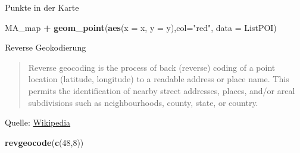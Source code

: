 \documentclass[ignorenonframetext,]{beamer}
\newenvironment{Shaded}{\begin{snugshade}}{\end{snugshade}}
\newcommand{\DataTypeTok}[1]{\textcolor[rgb]{0.13,0.29,0.53}{#1}}
\newcommand{\DecValTok}[1]{\textcolor[rgb]{0.00,0.00,0.81}{#1}}
\newcommand{\KeywordTok}[1]{\textcolor[rgb]{0.13,0.29,0.53}{\textbf{#1}}}
\newcommand{\NormalTok}[1]{#1}
\newcommand{\OperatorTok}[1]{\textcolor[rgb]{0.81,0.36,0.00}{\textbf{#1}}}
\newcommand{\StringTok}[1]{\textcolor[rgb]{0.31,0.60,0.02}{#1}}
\begin{document}
\begin{frame}[fragile]{Punkte in der Karte}
\protect\hypertarget{punkte-in-der-karte-1}{}

\begin{Shaded}
\begin{Highlighting}[]
\NormalTok{MA_map }\OperatorTok{+}
\KeywordTok{geom_point}\NormalTok{(}\KeywordTok{aes}\NormalTok{(}\DataTypeTok{x =}\NormalTok{ x, }\DataTypeTok{y =}\NormalTok{ y),}\DataTypeTok{col=}\StringTok{"red"}\NormalTok{,}
\DataTypeTok{data =}\NormalTok{ ListPOI)}
\end{Highlighting}
\end{Shaded}

\end{frame}

\begin{frame}[fragile]{Reverse Geokodierung}
\protect\hypertarget{reverse-geokodierung}{}

\begin{quote}
Reverse geocoding is the process of back (reverse) coding of a point
location (latitude, longitude) to a readable address or place name. This
permits the identification of nearby street addresses, places, and/or
areal subdivisions such as neighbourhoods, county, state, or country.
\end{quote}

Quelle:
\href{https://en.wikipedia.org/wiki/Reverse_geocoding}{Wikipedia}

\begin{Shaded}
\begin{Highlighting}[]
\KeywordTok{revgeocode}\NormalTok{(}\KeywordTok{c}\NormalTok{(}\DecValTok{48}\NormalTok{,}\DecValTok{8}\NormalTok{))}
\end{Highlighting}
\end{Shaded}

\end{frame}
\end{document}
